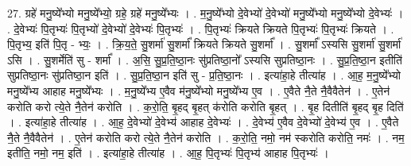 \documentclass[17pt]{extarticle}
\begin{document}
27. ग्रहे॑ मनु॒ष्ये᳚भ्यो मनु॒ष्ये᳚भ्यो॒ ग्रहे॒ ग्रहे॑ मनु॒ष्ये᳚भ्यः । . म॒नु॒ष्ये᳚भ्यो दे॒वेभ्यो॑ दे॒वेभ्यो॑ मनु॒ष्ये᳚भ्यो मनु॒ष्ये᳚भ्यो दे॒वेभ्यः॑ । . दे॒वेभ्यः॑ पि॒तृभ्यः॑ पि॒तृभ्यो॑ दे॒वेभ्यो॑ दे॒वेभ्यः॑ पि॒तृभ्यः॑ । . पि॒तृभ्यः॑ क्रियते क्रियते पि॒तृभ्यः॑ पि॒तृभ्यः॑ क्रियते । . पि॒तृभ्य॒ इति॑ पि॒तृ - भ्यः॒ । . क्रि॒य॒ते॒ सु॒शर्मा॑ सु॒शर्मा᳚ क्रियते क्रियते सु॒शर्मा᳚ । . सु॒शर्मा᳚ ऽस्यसि सु॒शर्मा॑ सु॒शर्मा॑ ऽसि । . सु॒शर्मेति॑ सु - शर्मा᳚ । . अ॒सि॒ सु॒प्र॒ति॒ष्ठा॒नः सु॑प्रतिष्ठा॒नो᳚ ऽस्यसि सुप्रतिष्ठा॒नः । . सु॒प्र॒ति॒ष्ठा॒न इतीति॑ सुप्रतिष्ठा॒नः सु॑प्रतिष्ठा॒न इति॑ । . सु॒प्र॒ति॒ष्ठा॒न इति॑ सु - प्र॒ति॒ष्ठा॒नः । . इत्या॑हा॒हे तीत्या॑ह । . आ॒ह॒ म॒नु॒ष्ये᳚भ्यो मनु॒ष्ये᳚भ्य आहाह मनु॒ष्ये᳚भ्यः । . म॒नु॒ष्ये᳚भ्य ए॒वैव म॑नु॒ष्ये᳚भ्यो मनु॒ष्ये᳚भ्य ए॒व । . ए॒वैते नै॒ते नै॒वैवैतेन॑ । . ए॒तेन॑ करोति करो त्ये॒ते नै॒तेन॑ करोति । . क॒रो॒ति॒ बृ॒हद् बृ॒हत् क॑रोति करोति बृ॒हत् । . बृ॒ह दितीति॑ बृ॒हद् बृ॒ह दिति॑ । . इत्या॑हा॒हे तीत्या॑ह । . आ॒ह॒ दे॒वेभ्यो॑ दे॒वेभ्य॑ आहाह दे॒वेभ्यः॑ । . दे॒वेभ्य॑ ए॒वैव दे॒वेभ्यो॑ दे॒वेभ्य॑ ए॒व । . ए॒वैते नै॒ते नै॒वैवैतेन॑ । . ए॒तेन॑ करोति करो त्ये॒ते नै॒तेन॑ करोति । . क॒रो॒ति॒ नमो॒ नम॑ स्करोति करोति॒ नमः॑ । . नम॒ इतीति॒ नमो॒ नम॒ इति॑ । . इत्या॑हा॒हे तीत्या॑ह । . आ॒ह॒ पि॒तृभ्यः॑ पि॒तृभ्य॑ आहाह पि॒तृभ्यः॑ । \newline
\end{document}
